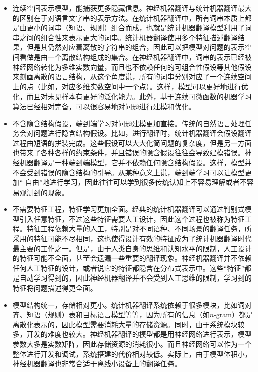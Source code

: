 \begin{itemize}
\vspace{0.5em}
\item 连续空间表示模型，能捕获更多隐藏信息。神经机器翻译与统计机器翻译最大的区别在于对语言文字串的表示方法。在统计机器翻译中，所有词串本质上都是由更小的词串（短语、规则）组合而成，也就是统计机器翻译模型利用了词串之间的组合性来表示更大的词串。统计机器翻译使用多个特征描述翻译结果，但是其仍然对应着离散的字符串的组合，因此可以把模型对问题的表示空间看做是由一个离散结构组成的集合。在神经机器翻译中，词串的表示已经被神经网络转化为多维实数向量，而且也不依赖任何的可组合性假设等其他假设来刻画离散的语言结构，从这个角度说，所有的词串分别对应了一个连续空间上的点（比如，对应多维实数空间中一个点）。这样，模型可以更好地进行优化，而且对未见样本有更好的泛化能力。此外，基于连续可微函数的机器学习算法已经相对完备，可以很容易地对问题进行建模和优化。

\vspace{0.5em}
\item 不含隐含结构假设，端到端学习对问题建模更加直接。传统的自然语言处理任务会对问题进行隐含结构假设。比如，进行翻译时，统计机器翻译会假设翻译过程由短语的拼装完成。这些假设可以大大化简问题的复杂度，但是另一方面也带来了各种各样的约束条件，并且错误的隐含假设往往会导致建模错误。神经机器翻译是一种端到端模型，它并不依赖任何隐含结构假设。这样，模型并不会受到错误的隐含结构的引导。从某种意义上说，端到端学习可以让模型更加“ 自由”地进行学习，因此往往可以学到很多传统认知上不容易理解或者不容易观测到的现象。

\vspace{0.5em}
\item 不需要特征工程，特征学习更加全面。经典的统计机器翻译可以通过判别式模型引入任意特征，不过这些特征需要人工设计，因此这个过程也被称为特征工程。特征工程依赖大量的人工，特别是对不同语种、不同场景的翻译任务，所采用的特征可能不尽相同，这也使得设计有效的特征成为了统计机器翻译时代最主要的工作之一。但是，由于人类自身的思维和认知水平的限制，人工设计的特征可能不全面，甚至会遗漏一些重要的翻译现象。神经机器翻译并不依赖任何人工特征的设计，或者说它的特征都隐含在分布式表示中。这些“特征”都是自动学习得到的，因此神经机器翻译并不会受到人工思维的限制，学习到的特征将问题描述得更全面。

\vspace{0.5em}
\item 模型结构统一，存储相对更小。统计机器翻译系统依赖于很多模块，比如词对齐、短语（规则）表和目标语言模型等等，因为所有的信息（如$n$-gram）都是离散化表示的，因此模型需要消耗大量的存储资源。同时，由于系统模块较多，开发的难度也较大。神经机器翻译的模型都是用神经网络进行表示，模型参数大多是实数矩阵，因此存储资源的消耗很小。而且神经网络可以作为一个整体进行开发和调试，系统搭建的代价相对较低。实际上，由于模型体积小，神经机器翻译也非常合适于离线小设备上的翻译任务。

\vspace{0.5em}
\end{itemize}

